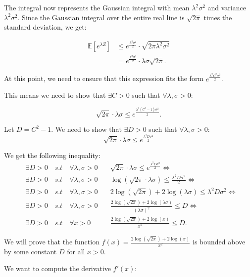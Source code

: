\documentclass[a4 paper]{article}
\theoremstyle{boldStyle}
\theoremstyle{boldBlueStyle}
\theoremstyle{boldPurpleStyle}
\theoremstyle{boldRedStyle}
\begin{document}
The integral now represents the Gaussian integral with mean \(\lambda^2 \sigma^2\) and variance \(\lambda^2 \sigma^2\). 
Since the Gaussian integral over the entire real line is \(\sqrt{2\pi}\) times the standard deviation, we get:

\begin{align*}
\mathbb{E}[e^{\lambda Z}] &\leq e^{\frac{\lambda^2 \sigma^2}{2}} \cdot \sqrt{2\pi \lambda^2 \sigma^2} \\
&= e^{\frac{\lambda^2 \sigma^2}{2}} \cdot \lambda \sigma \sqrt{2\pi}.
\end{align*}

At this point, we need to ensure that this expression fits the form \(e^{\frac{\lambda^2 C^2 \sigma^2}{2}}\). 

This means we need to show that \(\exists C > 0\) such that \(\forall \lambda, \sigma > 0\):

\[
\sqrt{2\pi} \cdot \lambda \sigma \leq e^{\frac{\lambda^2 (C^2 - 1) \sigma^2}{2}}.
\]

Let $D = C^2 - 1$. We need to show that $\exists D > 0$ such that $\forall \lambda, \sigma > 0$:
\[
\sqrt{2\pi} \cdot \lambda \sigma \leq e^{\frac{\lambda^2 D \sigma^2}{2}}
\]

We get the following inequality:
\begin{align*}  
&\exists D > 0 \quad {s.t} \quad \forall \lambda , \sigma >0 \quad &\sqrt{2\pi} \cdot \lambda \sigma \leq e^{\frac{\lambda^2 D \sigma^2}{2}} \iff \\
&\exists D > 0 \quad {s.t} \quad \forall \lambda , \sigma >0 \quad &\log(\sqrt{2\pi} \cdot \lambda \sigma) \leq \frac{\lambda^2 D \sigma^2}{2} \iff \\
&\exists D > 0 \quad {s.t} \quad \forall \lambda , \sigma >0 \quad &2\log(\sqrt{2\pi}) + 2\log(\lambda \sigma) \leq \lambda^2 D \sigma^2 \iff \\
&\exists D > 0 \quad {s.t} \quad \forall \lambda , \sigma >0 \quad &\frac{2\log(\sqrt{2\pi}) + 2\log(\lambda \sigma)}{(\lambda \sigma)^2} \leq D \iff \\
&\exists D > 0 \quad {s.t} \quad \forall x >0  &\frac{2\log(\sqrt{2\pi}) + 2\log(x)}{x^2} \leq D.
\end{align*}

We will prove that the function $f(x) = \frac{2\log(\sqrt{2\pi}) + 2\log(x)}{x^2}$ is bounded above by some constant $D$ for all $x > 0$. 

We want to compute the derivative \(f'(x)\):
\end{document}
